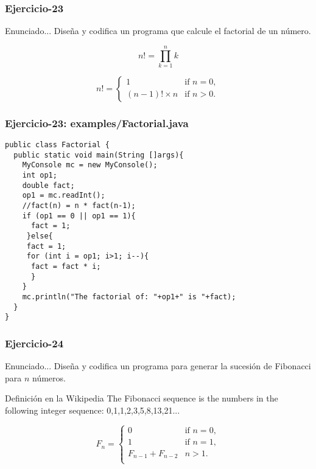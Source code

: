 \documentclass[xcolor=dvipsnames,dvip,notes=show,handout,table]{beamer}
\begin{document}
\begin{frame}[fragile]
\frametitle{Ejercicio-23}
\begin{block}{Enunciado...}
Diseña y codifica un programa que calcule el factorial de un número.
\end{block}


\begin{equation}
n!=\prod_{k=1}^n k \!  
\end{equation}


\begin{equation}
n! = \begin{cases}
1 & \text{if } n = 0, \\
(n-1)!\times n & \text{if } n > 0.
\end{cases}
\end{equation}


\end{frame}


\begin{frame}[fragile]
\frametitle{Ejercicio-23: examples/Factorial.java}
\scriptsize
\begin{lstlisting}
public class Factorial {
  public static void main(String []args){
    MyConsole mc = new MyConsole();
    int op1;
    double fact;
    op1 = mc.readInt();
    //fact(n) = n * fact(n-1);
    if (op1 == 0 || op1 == 1){
      fact = 1;
     }else{
     fact = 1;
     for (int i = op1; i>1; i--){
      fact = fact * i; 
      }
    }
    mc.println("The factorial of: "+op1+" is "+fact);
  }
}
\end{lstlisting}
\end{frame}



\begin{frame}[fragile]
\frametitle{Ejercicio-24}
\begin{block}{Enunciado...}
Diseña y codifica un programa para generar la sucesión de Fibonacci para $n$ números.
\end{block}
% 
\begin{exampleblock}{Definición en la Wikipedia}
The Fibonacci sequence is the numbers in the following integer sequence:
0,1,1,2,3,5,8,13,21...
\end{exampleblock}


\begin{equation}
F_n = \begin{cases}
0 & \text{if } n = 0, \\
1 & \text{if } n = 1, \\
F_{n-1} + F_{n-2} & n > 1.\\
\end{cases}
\end{equation}



\end{frame}
\end{document}
